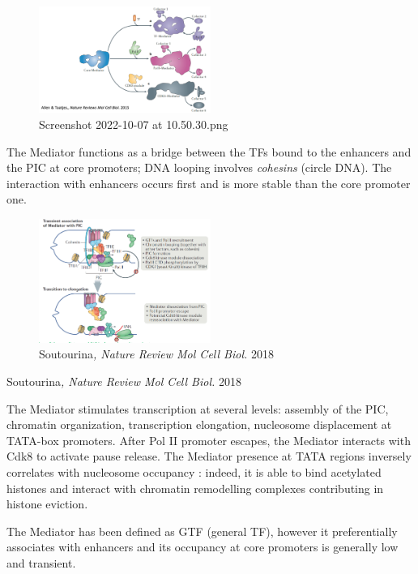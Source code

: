 \begin{figure}
\centering
\includegraphics[width=0.5\textwidth]{../_resources/Screenshot_2022-10-07_at_10-50-30.png}
\caption{Screenshot 2022-10-07 at 10.50.30.png}
\end{figure}

The Mediator functions as a bridge between the TFs bound to the enhancers and the PIC at core promoters; DNA looping involves \emph{cohesins} (circle DNA). The interaction with enhancers occurs first and is more stable than the core promoter one.

\begin{figure}
\centering
\includegraphics[width=0.5\textwidth]{../_resources/Screenshot_2022-10-07_at_10-54-13.png}
\caption{Soutourina\emph{, Nature Review Mol Cell Biol.} 2018}
\end{figure}

Soutourina\emph{, Nature Review Mol Cell Biol.} 2018

The Mediator stimulates transcription at several levels: assembly of the PIC, chromatin organization, transcription elongation, nucleosome displacement at TATA-box promoters. After Pol II promoter escapes, the Mediator interacts with Cdk8 to activate pause release. The Mediator presence at TATA regions inversely correlates with nucleosome occupancy : indeed, it is able to bind acetylated histones and interact with chromatin remodelling complexes contributing in histone eviction.

The Mediator has been defined as GTF (general TF), however it preferentially associates with enhancers and its occupancy at core promoters is generally low and transient.

